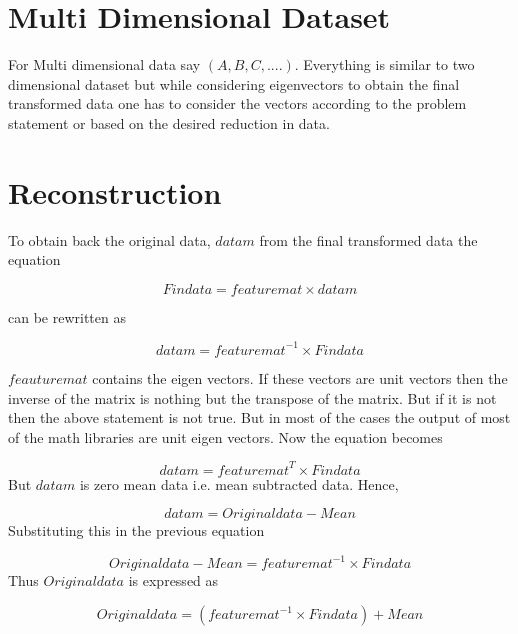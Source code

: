 \documentclass[a4paper]{article}
\begin{document}
\section{Multi Dimensional Dataset}
For Multi dimensional data say $(A,B,C,....)$. Everything is similar to two dimensional dataset but while considering eigenvectors to obtain the final transformed data one has to consider the vectors according to the problem statement or based on the desired reduction in data.

\section{Reconstruction}
To obtain back the original data, $datam$ from the final transformed data the equation 

$$Findata = featuremat \times datam$$

can be rewritten as

$$datam = {featuremat}^{-1} \times Findata$$

$feauturemat$ contains the eigen vectors. If these vectors are unit vectors then the inverse of the matrix is nothing but the transpose of the matrix. But if it is not then the above statement is not true. But in most of the cases the output of most of the math libraries are unit eigen vectors. Now the equation becomes

$$datam = {featuremat}^{T} \times Findata$$
\parskip 0pt 
But $datam$ is zero mean data i.e. mean subtracted data. Hence,

$$datam = Originaldata - Mean$$
\parskip 0pt 
Substituting this in the previous equation

$$Originaldata - Mean = {featuremat}^{-1} \times Findata$$
\parskip 0pt 
Thus $Originaldata$ is expressed as

$$Originaldata = ({featuremat}^{-1} \times Findata) + Mean$$



\end{document}
